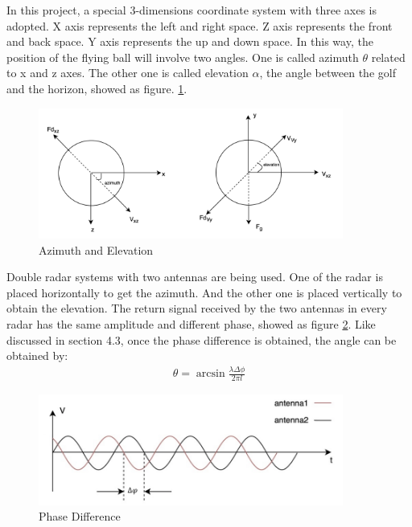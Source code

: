 In this project, a special 3-dimensions coordinate system with three axes is adopted. X axis represents the left and right space. Z axis represents the front and back space. Y axis represents the up and down space. In this way, the position of the flying ball will involve two angles. One is called azimuth $\theta$ related to x and z axes. The other one is called elevation $\alpha$, the angle between the golf and the horizon, showed as figure. \ref{fig:angle}.
\begin{figure}[H]
    \centering
    \includegraphics[width=10cm]{figure/Angle.png}
    \caption{Azimuth and Elevation}
    \label{fig:angle}
\end{figure}
Double radar systems with two antennas are being used. One of the radar is placed horizontally to get the azimuth. And the other one is placed vertically to obtain the elevation. The return signal received by the two antennas in every radar has the same amplitude and different phase, showed as figure \ref{fig:PD}. Like discussed in section 4.3, once the phase difference is obtained, the angle can be obtained by: 
\begin{align}
 \theta=\arcsin \frac{\lambda \Delta \phi}{2 \pi l}   
\end{align}
\begin{figure}[H]
    \centering
    \includegraphics[width=10cm]{figure/Phase3.png}
    \caption{Phase Difference}
    \label{fig:PD}
\end{figure}
